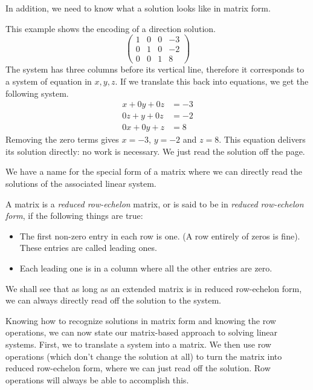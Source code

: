 \documentclass[fleqn]{report}
\begin{document}
In addition, we need to know what a solution looks like in
matrix form. 
\begin{example}
This example shows the encoding of a direction solution.
\begin{displaymath}
\left(
\begin{array}{ccc|c}
1 & 0 & 0 & -3 \\
0 & 1 & 0 & -2 \\
0 & 0 & 1 & 8
\end{array}
\right)
\end{displaymath}
The system has three columns before its vertical line, therefore it
corresponds to a system of equation in $x,y,z$. If we translate
this back into equations, we get the following system.
\begin{align*}
x + 0y + 0z & = -3 \\
0z + y + 0z & = -2 \\
0x + 0y + z & = 8
\end{align*}
Removing the zero terms gives $x=-3$, $y=-2$ and $z=8$. This
equation delivers its solution directly: no work is necessary.
We just read the solution off the page.
\end{example}

We have a name for the special form of a matrix where we can
directly read the solutions of the associated linear system.
\begin{defn}
A matrix is a \emph{reduced row-echelon} matrix, or is said to
be in \emph{reduced row-echelon form}, if the following things
are true:
\begin{itemize}
\item The first non-zero entry in each row is one. (A row
entirely of zeros is fine). These entries are called leading
ones.
\item Each leading one is in a column where all the other
entries are zero. 
\end{itemize}
\end{defn}

We shall see that as long as an extended matrix is in reduced
row-echelon form, we can always directly read off the solution
to the system. 

Knowing how to recognize solutions in matrix form and knowing
the row operations, we can now state our matrix-based approach
to solving linear systems. First, we to translate a system
into a matrix. We then use row operations (which don't change
the solution at all) to turn the matrix into reduced
row-echelon form, where we can just read off the solution. Row
operations will always be able to accomplish this. 
\end{document}
